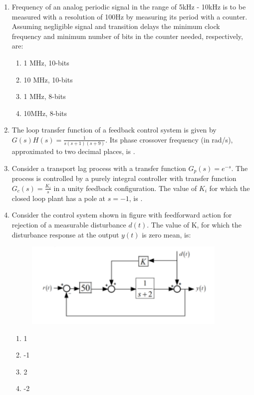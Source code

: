\documentclass[journal,12pt,onecolumn]{IEEEtran}
\theoremstyle{remark}
\begin{document}
\begin{enumerate}
    \item Frequency of an analog periodic signal in the range of 5kHz - 10kHz is to be measured with a resolution of 100Hz by measuring its period with a counter. Assuming negligible signal and transition delays the minimum clock frequency and minimum number of bits in the counter needed, respectively, are:
    \begin{multicols}{2}
        \begin{enumerate}
            \item 1 MHz, 10-bits
            \item 10 MHz, 10-bits
            \item 1 MHz, 8-bits
            \item 10MHz, 8-bits
        \end{enumerate}
    \end{multicols}

    \item The loop transfer function of a feedback control system is given by $G(s)H(s) = \frac{1}{s(s+1)(s+9)}$. Its phase crossover frequency (in rad/s), approximated to two decimal places, is \underline{\hspace{2cm}}.

    \vspace{0.5cm}
    
    \item Consider a transport lag process with a transfer function $G_p(s) = e^{-s}$. The process is controlled by a purely integral controller with transfer function $G_c(s) = \frac{K_i}{s}$ in a unity feedback configuration. The value of $K_i$ for which the closed loop plant has a pole at $s = -1$, is \underline{\hspace{2cm}}.

    \vspace{0.5cm}

    \item Consider the control system shown in figure with feedforward action for rejection of a measurable disturbance $d(t)$. The value of K, for which the disturbance response at the output $y(t)$ is zero mean, is:
    \begin{figure}[H]
        \centering
        \includegraphics[width=0.62\columnwidth]{q51}
        \caption*{}
        \label{fig:placeholder}
    \end{figure}
    \begin{multicols}{4}
        \begin{enumerate}
            \item 1
            \item -1
            \item 2
            \item -2
        \end{enumerate}
    \end{multicols}


\end{enumerate}
\end{document}
